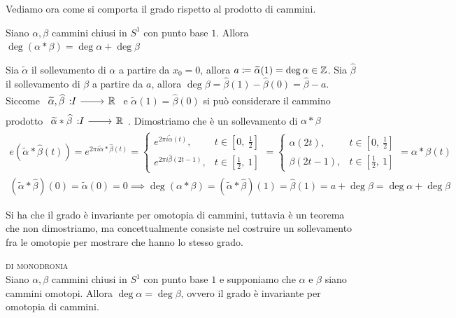 Vediamo ora come si comporta il grado rispetto al prodotto di cammini.
\begin{theorema}
	Siano $\alpha, \beta$ cammini chiusi in $S^1$ con punto base $1$. Allora $\deg(\alpha\ast\beta)=\deg\alpha +\deg\beta$
\end{theorema}
\begin{demonstration}
	Sia $\widetilde{\alpha}$ il sollevamento di $\alpha$ a partire da $x_0=0$, allora $a\coloneqq \widetilde{\alpha}(1)=\deg\alpha\in\mathbb{Z}$. Sia $\widehat{\beta}$ il sollevamento di $\beta$ a partire da $a$, allora $\deg\beta=\widehat{\beta}(1)-\widehat{\beta}(0)=\widehat{\beta}-a$. Siccome $\funz {\widetilde{\alpha},\widehat{\beta}} I \realset$ e $\widetilde{\alpha}(1)=\widehat{\beta}(0)$ si può considerare il cammino prodotto $\funz {\widetilde{\alpha}\ast\widehat{\beta}} I \realset$. Dimostriamo che è un sollevamento di $\alpha\ast\beta$
		\begin{gather*}
			e\left( \widetilde{\alpha}\ast\widehat{\beta}(t) \right)= e^{2\pi i \widetilde{\alpha}\ast\widehat{\beta}(t)}=\begin{cases}
				e^{2\pi i \widetilde{\alpha}(t)}, & t\in \left[ 0,\ \frac{1}{2} \right]\\
				e^{2\pi i \widehat{\beta}(2t-1)}, & t\in \left[ \frac{1}{2},\ 1 \right]
			\end{cases}=\begin{cases}
				\alpha(2t), & t\in \left[ 0,\ \frac{1}{2} \right]\\
				\beta(2t-1), & t\in \left[ \frac{1}{2},\ 1 \right]
			\end{cases}= \alpha\ast\beta(t)\\
			(\widetilde{\alpha}\ast\widehat{\beta})(0)=\widetilde{\alpha}(0)=0 \implies \deg(\alpha\ast\beta)=(\widetilde{\alpha}\ast\widehat{\beta})(1)=\widehat{\beta}(1)=a+\deg\beta=\deg\alpha +\deg\beta 
		\end{gather*}
\end{demonstration}


Si ha che il grado è invariante per omotopia di cammini, tuttavia è un teorema che non dimostriamo, ma concettualmente consiste nel costruire un sollevamento fra le omotopie per mostrare che hanno lo stesso grado.
\begin{theorema} \textsc{di monodronia}\\
	Siano $\alpha,\beta$ cammini chiusi in $S^1$ con punto base $1$ e supponiamo che $\alpha$ e $\beta$ siano cammini omotopi. Allora $\deg\alpha=\deg\beta$, ovvero il grado è invariante per omotopia di cammini.
\end{theorema}

